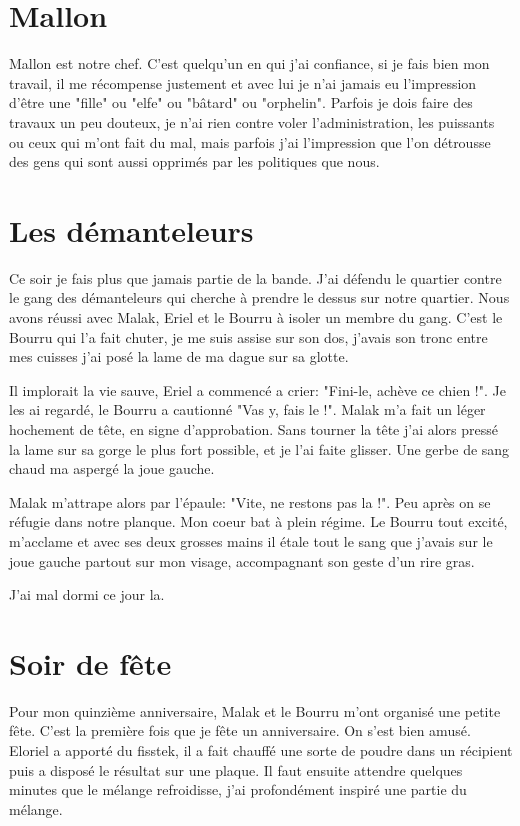 \documentclass[10pt,a4paper,twoside,twocolumn,openany]{book}
\begin{document}
\section{Mallon}
Mallon est notre chef. C'est quelqu'un en qui j'ai confiance, si je fais bien mon travail, il me
récompense justement et avec lui je n'ai jamais eu l'impression d'être une "fille" ou "elfe" ou
"bâtard" ou "orphelin". Parfois je dois faire des travaux un peu douteux, je n'ai rien contre voler
l'administration, les puissants ou ceux qui m'ont fait du mal, mais parfois j'ai l'impression que l'on
détrousse des gens qui sont aussi opprimés par les politiques que nous.

\section{Les démanteleurs}

Ce soir je fais plus que jamais partie de la bande. J'ai défendu le quartier contre le gang des
démanteleurs qui cherche à prendre le dessus sur notre quartier.
Nous avons réussi avec Malak, Eriel et le Bourru à isoler un membre du gang. C'est le Bourru
qui l'a fait chuter, je me suis assise sur son dos, j'avais son tronc entre mes cuisses j'ai posé 
la lame de ma dague sur sa glotte. 

Il implorait la vie sauve, Eriel a commencé a crier: "Fini-le, achève ce chien !". Je les ai regardé,
le Bourru a cautionné "Vas y, fais le !". Malak m'a fait un léger hochement de tête, en signe
d'approbation. Sans tourner la tête j'ai alors pressé la lame sur sa gorge le plus fort possible,
et je l'ai faite glisser. Une gerbe de sang chaud ma aspergé la joue gauche.

Malak m'attrape alors par l'épaule: "Vite, ne restons pas la !". Peu après on se réfugie dans notre planque.
Mon coeur bat à plein régime. Le Bourru tout excité, m'acclame et avec ses deux grosses mains il étale
tout le sang que j'avais sur le joue gauche partout sur mon visage, accompagnant son geste d'un rire gras. 

J'ai mal dormi ce jour la.

\section{Soir de fête}

Pour mon quinzième anniversaire, Malak et le Bourru m'ont organisé une petite fête. C'est la première fois
que je fête un anniversaire. On s'est bien amusé. Eloriel a apporté du fisstek, il a fait chauffé une 
sorte de poudre dans un récipient puis a disposé le résultat sur une plaque. Il faut ensuite
attendre quelques minutes que le mélange refroidisse, j'ai profondément inspiré une partie du mélange.
\end{document}
